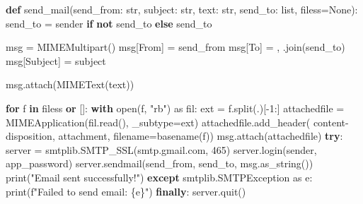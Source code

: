 \documentclass[
  letterpaper,
  DIV=11,
  numbers=noendperiod]{scrreprt}
\newenvironment{Shaded}{\begin{snugshade}}{\end{snugshade}}
\newcommand{\BuiltInTok}[1]{\textcolor[rgb]{0.00,0.23,0.31}{#1}}
\newcommand{\ControlFlowTok}[1]{\textcolor[rgb]{0.00,0.23,0.31}{\textbf{#1}}}
\newcommand{\DecValTok}[1]{\textcolor[rgb]{0.68,0.00,0.00}{#1}}
\newcommand{\ImportTok}[1]{\textcolor[rgb]{0.00,0.46,0.62}{#1}}
\newcommand{\KeywordTok}[1]{\textcolor[rgb]{0.00,0.23,0.31}{\textbf{#1}}}
\newcommand{\NormalTok}[1]{\textcolor[rgb]{0.00,0.23,0.31}{#1}}
\newcommand{\OperatorTok}[1]{\textcolor[rgb]{0.37,0.37,0.37}{#1}}
\newcommand{\SpecialCharTok}[1]{\textcolor[rgb]{0.37,0.37,0.37}{#1}}
\newcommand{\SpecialStringTok}[1]{\textcolor[rgb]{0.13,0.47,0.30}{#1}}
\newcommand{\StringTok}[1]{\textcolor[rgb]{0.13,0.47,0.30}{#1}}
\newcommand{\VariableTok}[1]{\textcolor[rgb]{0.07,0.07,0.07}{#1}}
\begin{document}
\begin{Shaded}
\begin{Highlighting}[]
\KeywordTok{def}\NormalTok{ send\_mail(send\_from: }\BuiltInTok{str}\NormalTok{, subject: }\BuiltInTok{str}\NormalTok{, text: }\BuiltInTok{str}\NormalTok{,}
\NormalTok{              send\_to: }\BuiltInTok{list}\NormalTok{, filess}\OperatorTok{=}\VariableTok{None}\NormalTok{):}
\NormalTok{    send\_to }\OperatorTok{=}\NormalTok{ sender }\ControlFlowTok{if} \KeywordTok{not}\NormalTok{ send\_to }\ControlFlowTok{else}\NormalTok{ send\_to}

\NormalTok{    msg }\OperatorTok{=}\NormalTok{ MIMEMultipart()}
\NormalTok{    msg[}\StringTok{\textquotesingle{}From\textquotesingle{}}\NormalTok{] }\OperatorTok{=}\NormalTok{ send\_from}
\NormalTok{    msg[}\StringTok{\textquotesingle{}To\textquotesingle{}}\NormalTok{] }\OperatorTok{=} \StringTok{\textquotesingle{}, \textquotesingle{}}\NormalTok{.join(send\_to)}
\NormalTok{    msg[}\StringTok{\textquotesingle{}Subject\textquotesingle{}}\NormalTok{] }\OperatorTok{=}\NormalTok{ subject}

\NormalTok{    msg.attach(MIMEText(text))}

    \ControlFlowTok{for}\NormalTok{ f }\KeywordTok{in}\NormalTok{ filess }\KeywordTok{or}\NormalTok{ []:}
        \ControlFlowTok{with} \BuiltInTok{open}\NormalTok{(f, }\StringTok{"rb"}\NormalTok{) }\ImportTok{as}\NormalTok{ fil:}
\NormalTok{            ext }\OperatorTok{=}\NormalTok{ f.split(}\StringTok{\textquotesingle{}.\textquotesingle{}}\NormalTok{)[}\OperatorTok{{-}}\DecValTok{1}\NormalTok{:]}
\NormalTok{            attachedfile }\OperatorTok{=}\NormalTok{ MIMEApplication(fil.read(), \_subtype}\OperatorTok{=}\NormalTok{ext)}
\NormalTok{            attachedfile.add\_header(}
                \StringTok{\textquotesingle{}content{-}disposition\textquotesingle{}}\NormalTok{, }\StringTok{\textquotesingle{}attachment\textquotesingle{}}\NormalTok{, filename}\OperatorTok{=}\NormalTok{basename(f))}
\NormalTok{        msg.attach(attachedfile)}
    \ControlFlowTok{try}\NormalTok{:}
\NormalTok{      server }\OperatorTok{=}\NormalTok{ smtplib.SMTP\_SSL(}\StringTok{\textquotesingle{}smtp.gmail.com\textquotesingle{}}\NormalTok{, }\DecValTok{465}\NormalTok{)}
\NormalTok{      server.login(sender, app\_password)}
\NormalTok{      server.sendmail(send\_from, send\_to, msg.as\_string())}
      \BuiltInTok{print}\NormalTok{(}\StringTok{"Email sent successfully!"}\NormalTok{)}
    \ControlFlowTok{except}\NormalTok{ smtplib.SMTPException }\ImportTok{as}\NormalTok{ e:}
      \BuiltInTok{print}\NormalTok{(}\SpecialStringTok{f"Failed to send email: }\SpecialCharTok{\{}\NormalTok{e}\SpecialCharTok{\}}\SpecialStringTok{"}\NormalTok{)}
    \ControlFlowTok{finally}\NormalTok{:}
\NormalTok{      server.quit()}
\end{Highlighting}
\end{Shaded}
\end{document}
